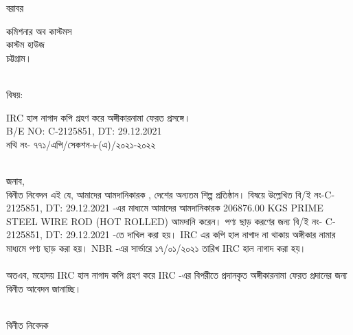\documentclass[12pt]{article}
\newcommand{\fileno}{নথি নং- ৭৭১/এপি/সেকশন-৮(এ)/২০২১-২০২২}
\newcommand{\beno}{C-2125851}
\newcommand{\bedt}{29.12.2021}
\newcommand{\pkg}{206876.00 KGS}
\newcommand{\good}{PRIME STEEL WIRE ROD (HOT ROLLED)}
\newcommand{\impn}{\jwel}
\newcommand{\ircupdate}{১৭/০১/২০২১}
\begin{document}
\fontsize{16pt}{16pt}\selectfont
\noindent
বরাবর
\\
\begin{minipage}[t]{0.06\linewidth}
\hspace{1em}
\end{minipage}
\begin{minipage}[t]{0.94\linewidth}
কমিশনার অব কাস্টমস
\\
কাস্টম হাউজ
\\
চট্টগ্রাম।
\\
\\
\end{minipage}
\begin{minipage}[t]{0.08\linewidth}
বিষয়:
\end{minipage}
\begin{minipage}[t]{0.92\linewidth}
IRC হাল নাগাদ কপি গ্রহণ করে অঙ্গীকারনামা ফেরত প্রসঙ্গে।
\\
B/E NO: {\beno}, DT: {\bedt}
\\
{\fileno}
\\
\\
\end{minipage}
জনাব,
\\
\hspace*{2.7em}
বিনীত নিবেদন এই যে, আমাদের আমদানিকারক {\impn},
দেশের অন্যতম শিল্প প্রতিষ্ঠান।
বিষয়ে উল্লেখিত বি/ই নং-{\beno}, DT: {\bedt} -এর মাধ্যমে
আমাদের আমদানিকারক {\pkg} {\good}
আমদানি করেন। পণ্য ছাড় করণের জন্য
বি/ই নং- {\beno}, DT: {\bedt} -তে দাখিল করা হয়। IRC এর কপি
হাল নাগাদ না থাকায় অঙ্গীকার নামার মাধ্যমে পণ্য ছাড় করা হয়। NBR -এর
সার্ভারে {\ircupdate} তারিখ
IRC হাল নাগাদ করা হয়।
\\
\\
অতএব, মহোদয় IRC হাল নাগাদ কপি গ্রহণ করে
IRC -এর বিপরীতে প্রদানকৃত অঙ্গীকারনামা ফেরত
প্রদানের জন্য বিনীত আবেদন জানাচ্ছি।
\\
\\
\begin{minipage}[t]{0.55\linewidth}
\hspace{0em}
\end{minipage}
\begin{minipage}[t]{0.45\linewidth}
বিনীত নিবেদক
\\
\\
\\
\\
\\
\footnotesize{{\cnfn}}
\end{minipage}
\thispagestyle{laststyle}
\end{document}
